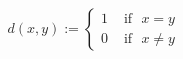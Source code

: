 \documentclass[preview]{standalone}
\begin{document}
\begin{align*}
d(x,y) := \begin{cases}1  &  \text{ if} \ \ \ x=y \\0 &  \text{ if} \ \ \ x \neq y\end{cases}
\end{align*}
\end{document}
